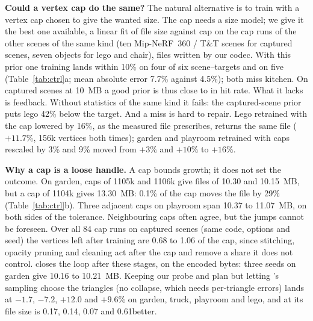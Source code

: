 \noindent\textbf{Could a vertex cap do the same?} The natural alternative is to train \MS with a vertex cap chosen to give the wanted size. The cap needs a size model; we give it the best one available, a linear fit of file size against cap on the cap runs of the other scenes of the same kind (ten Mip-NeRF~360 / T\&T scenes for captured scenes, seven objects for lego and chair), files written by our codec. With this prior one training lands within 10\% on four of six scene--targets and \BM on five (Table~\ref{tab:ctrl}a; mean absolute error 7.7\% against 4.5\%); both miss kitchen. On captured scenes at 10~MB a good prior is thus close to \BM in hit rate. What it lacks is feedback. Without statistics of the same kind it fails: the captured-scene prior puts lego 42\% below the target. And a miss is hard to repair. Lego retrained with the cap lowered by 16\%, as the measured file prescribes, returns the same file ($+11.7\%$, 156k vertices both times); garden and playroom retrained with caps rescaled by 3\% and 9\% moved from $+3\%$ and $+10\%$ to $+16\%$.

\noindent\textbf{Why a cap is a loose handle.} A cap bounds growth; it does not set the outcome. On garden, caps of 1105k and 1106k give files of 10.30 and 10.15~MB, but a cap of 1104k gives 13.30~MB: 0.1\% of the cap moves the file by 29\% (Table~\ref{tab:ctrl}b). Three adjacent caps on playroom span 10.37 to 11.07~MB, on both sides of the tolerance. Neighbouring caps often agree, but the jumps cannot be foreseen. Over all 84 cap runs on captured scenes (same code, options and seed) the vertices left after training are 0.68 to 1.06 of the cap, since stitching, opacity pruning and cleaning act after the cap and remove a share it does not control. \BM closes the loop after these stages, on the encoded bytes: three seeds on garden give 10.16 to 10.21~MB. Keeping our probe and plan but letting \MS's sampling choose the triangles (no collapse, which needs per-triangle errors) lands at $-1.7$, $-7.2$, $+12.0$ and $+9.6\%$ on garden, truck, playroom and lego, and at its file size \BM is 0.17, 0.14, 0.07 and 0.61\dB better.

